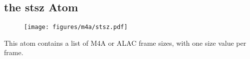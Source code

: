 \clearpage

\subsection{the stsz Atom}
\label{atom:stsz}
\begin{figure}[h]
  \texttt{[image: figures/m4a/stsz.pdf]}
\end{figure}
\par
\noindent
This atom contains a list of M4A or ALAC frame sizes,
with one size value per frame.
